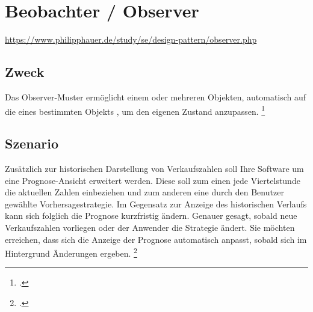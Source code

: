 \documentclass{lehramt-informatik-haupt}
\begin{document}

\chapter{Beobachter / Observer}

\begin{quellen}
\item \cite{wiki:beobachter}
\item \url{https://www.philipphauer.de/study/se/design-pattern/observer.php}
\item \cite[Seite 249-257]{gof}
\item \cite[Kapitel 8.5.1, Seite 269-274]{schatten}
\item \cite[Kapitel 4.7, Seite 70-75]{eilebrecht}
\item \cite[Seite 269]{siebler}
\end{quellen}

%

\section{Zweck}

Das Observer-Muster ermöglicht einem oder mehreren Objekten, automatisch
auf die  eines bestimmten Objekts , um den eigenen Zustand anzupassen.
\footcite[Seite 70]{eilebrecht}

%

\section{Szenario}

Zusätzlich zur historischen Darstellung von Verkaufszahlen soll Ihre
Software um eine Prognose-Ansicht erweitert werden. Diese soll zum einen
jede Viertelstunde die aktuellen Zahlen einbeziehen und zum anderen eine
durch den Benutzer gewählte Vorhersagestrategie. Im Gegensatz zur
Anzeige des historischen Verlaufs kann sich folglich die Prognose
kurzfristig ändern. Genauer gesagt, sobald neue Verkaufszahlen vorliegen
oder der Anwender die Strategie ändert. Sie möchten erreichen, dass sich
die Anzeige der Prognose automatisch anpasst, sobald sich im Hintergrund
Änderungen ergeben.
\footcite[Seite 70]{eilebrecht}
\end{document}
